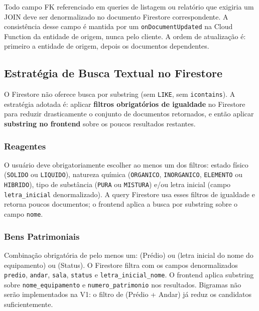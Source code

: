 \documentclass[12pt,a4paper]{article}
\begin{document}
\begin{regra}
Todo campo FK referenciado em queries de listagem ou relatório que exigiria um JOIN deve ser denormalizado no documento Firestore correspondente. A consistência desse campo é mantida por um \texttt{onDocumentUpdated} na Cloud Function da entidade de origem, nunca pelo cliente. A ordem de atualização é: primeiro a entidade de origem, depois os documentos dependentes.
\end{regra}

\subsection{Estratégia de Busca Textual no Firestore}
\label{subsec:busca-textual}

\begin{explicacao}
O Firestore não oferece busca por substring (sem \texttt{LIKE}, sem \texttt{icontains}). A estratégia adotada é: aplicar \textbf{filtros obrigatórios de igualdade} no Firestore para reduzir drasticamente o conjunto de documentos retornados, e então aplicar \textbf{substring no frontend} sobre os poucos resultados restantes.
\end{explicacao}

\subsubsection{Reagentes}
O usuário deve obrigatoriamente escolher ao menos um dos filtros: estado físico (\texttt{SOLIDO} ou \texttt{LIQUIDO}), natureza química (\texttt{ORGANICO}, \texttt{INORGANICO}, \texttt{ELEMENTO} ou \texttt{HIBRIDO}), tipo de substância (\texttt{PURA} ou \texttt{MISTURA}) e/ou letra inicial (campo \texttt{letra\_inicial} denormalizado). A query Firestore usa esses filtros de igualdade e retorna poucos documentos; o frontend aplica a busca por substring sobre o campo \texttt{nome}.

\subsubsection{Bens Patrimoniais}
Combinação obrigatória de pelo menos um: (Prédio) ou (letra inicial do nome do equipamento) ou (Status). O Firestore filtra com os campos denormalizados \texttt{predio}, \texttt{andar}, \texttt{sala}, \texttt{status} e \texttt{letra\_inicial\_nome}. O frontend aplica substring sobre \texttt{nome\_equipamento} e \texttt{numero\_patrimonio} nos resultados. Bigramas não serão implementados na V1: o filtro de (Prédio + Andar) já reduz os candidatos suficientemente.
\end{document}
